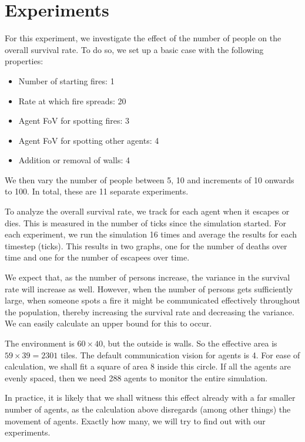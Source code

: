 \documentclass[a4paper]{article}
\begin{document}
\FloatBarrier
\section{Experiments}
For this experiment, we investigate the effect of the number of people on the overall survival rate. To do so, we set up a basic case with the following properties:
\begin{itemize}
\item Number of starting fires: 1
\item Rate at which fire spreads: 20\textperthousand
\item Agent FoV for spotting fires: 3
\item Agent FoV for spotting other agents: 4
\item Addition or removal of walls: 4
\end{itemize}

We then vary the number of people between 5, 10 and increments of 10 onwards to 100. In total, these are 11 separate experiments.

To analyze the overall survival rate, we track for each agent when it escapes or dies. This is measured in the number of ticks since the simulation started. For each experiment, we run the simulation 16 times and average the results for each timestep (ticks). This results in two graphs, one for the number of deaths over time and one for the number of escapees over time.

We expect that, as the number of persons increase, the variance in the survival rate will increase as well. However, when the number of persons gets sufficiently large, when someone spots a fire it might be communicated effectively throughout the population, thereby increasing the survival rate and decreasing the variance. We can easily calculate an upper bound for this to occur. 

The environment is \(60\times 40\), but the outside is walls. So the effective area is \(59 \times 39 = 2301\) tiles. The default communication vision for agents is 4. For ease of calculation, we shall fit a square of area 8 inside this circle. If all the agents are evenly spaced, then we need 288 agents to monitor the entire simulation.

In practice, it is likely that we shall witness this effect already with a far smaller number of agents, as the calculation above disregards (among other things) the movement of agents. Exactly how many, we will try to find out with our experiments.
\end{document}
